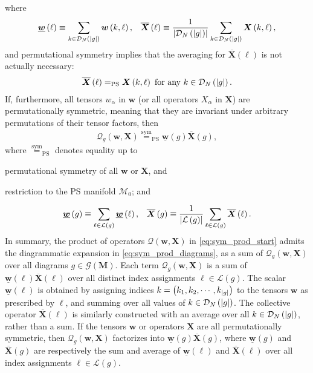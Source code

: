 \documentclass[nofootinbib,notitlepage,11pt]{revtex4-2}
\renewcommand{\t}{\text} %
\newcommand{\f}[2]{\dfrac{#1}{#2}} %
\newcommand{\p}[1]{\left(#1\right)} %
\newcommand{\m}{\bm} %
\newcommand{\1}{\mathds{1}}
\newcommand{\D}{\mathcal{D}}
\newcommand{\G}{\mathcal{G}}
\renewcommand{\L}{\mathcal{L}}
\newcommand{\M}{\mathcal{M}}
\newcommand{\Q}{\mathcal{Q}}
\newcommand{\EQPS}{=_{\text{PS}}}
\newcommand{\col}{\underline}
\newcommand{\mean}{\overline}
\begin{document}
where
\begin{align}
  \col{\m w}\p{\ell} \equiv \sum_{k\in\D_N\p{\abs{g}}} \m w\p{k,\ell},
  &&
  \mean{\m X}\p{\ell}
  \equiv \f1{\abs{\D_N\p{\abs{g}}}}
  \sum_{k\in\D_N\p{\abs{g}}} \m X\p{k,\ell},
\end{align}
and permutational symmetry implies that the averaging for $\mean{\m X}\p{\ell}$ is not actually necessary:
\begin{align}
  \mean{\m X}\p{\ell}
  \EQPS \m X\p{k,\ell} ~\t{for any}~ k\in\D_N\p{\abs{g}}.
\end{align}
If, furthermore, all tensors $w_\alpha$ in $\m w$ (or all operators $X_\alpha$ in $\m X$) are permutationally symmetric, meaning that they are invariant under arbitrary permutations of their tensor factors, then
\begin{align}
  \Q_g\p{\m w,\m X}
  \stackrel{\t{sym}}{=}_{\t{PS}} \col{\m w}\p{g} \mean{\m X}\p{g},
  \label{eq:sum_diagrams}
\end{align}
where $\stackrel{\t{sym}}{=}_{\t{PS}}$ denotes equality up to
\begin{enumerate*}
\item permutational symmetry of all $\m w$ or $\m X$, and
\item restriction to the PS manifold $\M_0$; and
\end{enumerate*}
\begin{align}
  \col{\m w}\p{g} \equiv \sum_{\ell\in\L\p{g}} \col{\m w}\p{\ell},
  &&
  \mean{\m X}\p{g} \equiv \f1{\abs{\L\p{g}}}
  \sum_{\ell\in\L\p{g}} \mean{\m X}\p{\ell}.
\end{align}
In summary, the product of operators $\Q\p{\m w,\m X}$ in \eqref{eq:sym_prod_start} admits the diagrammatic expansion in \eqref{eq:sym_prod_diagrams}, as a sum of $\Q_g\p{\m w,\m X}$ over all diagrams $g\in\G\p{\m M}$.
Each term $\Q_g\p{\m w,\m X}$ is a sum of $\col{\m w}\p{\ell}\mean{\m X}\p{\ell}$ over all distinct index assignments $\ell\in\L\p{g}$.
The scalar $\col{\m w}\p{\ell}$ is obtained by assigning indices $k=\p{k_1,k_2,\cdots,k_{\abs{g}}}$ to the tensors $\m w$ as prescribed by $\ell$, and summing over all values of $k\in\D_N\p{\abs{g}}$.
The collective operator $\mean{\m X}\p{\ell}$ is similarly constructed with an average over all $k\in\D_N\p{\abs{g}}$, rather than a sum.
If the tensors $\m w$ or operators $\m X$ are all permutationally symmetric, then $\Q_g\p{\m w,\m X}$ factorizes into $\col{\m w}\p{g}\mean{\m X}\p{g}$, where $\col{\m w}\p{g}$ and $\mean{\m X}\p{g}$ are respectively the sum and average of $\col{\m w}\p{\ell}$ and $\mean{\m X}\p{\ell}$ over all index assignments $\ell\in\L\p{g}$.
\end{document}
